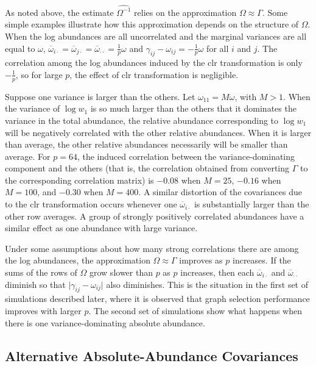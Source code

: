 \documentclass[10pt]{article}
\begin{document}
As noted above, the estimate $\widehat{\Omega^{-1}}$ relies on the approximation $\Omega \approx \Gamma$. Some simple examples illustrate how this approximation depends on the structure of $\Omega$. When the log abundances are all uncorrelated and the marginal variances are all equal to $\omega$, $\overline{\omega}_{i\cdot} = \overline{\omega}_{j\cdot} = \overline{\omega}_{\cdot\cdot} = \frac{1}{p}\omega$ and $\gamma_{ij} - \omega_{ij} = -\frac{1}{p}\omega$ for all $i$ and $j$. The correlation among the log abundances induced by the clr transformation is only $-\frac{1}{p}$, so for large $p$, the effect of clr transformation is negligible.

Suppose one variance is larger than the others. Let $\omega_{11} = M\omega$, with $M > 1$. When the variance of $\log w_1$ is so much larger than the others that it dominates the variance in the total abundance, the relative abundance corresponding to $\log w_1$ will be negatively correlated with the other relative abundances. When it is larger than average, the other relative abundances necessarily will be smaller than average. For $p = 64$, the induced correlation between the variance-dominating component and the others (that is, the correlation obtained from converting $\Gamma$ to the corresponding correlation matrix) is $-0.08$ when $M = 25$, $-0.16$ when $M = 100$, and $-0.30$ when $M = 400$. A similar distortion of the covariances due to the clr transformation occurs whenever one $\overline{\omega}_{i\cdot}$ is substantially larger than the other row averages. A group of strongly positively correlated abundances have a similar effect as one abundance with large variance.

Under some assumptions about how many strong correlations there are among the log abundances, the approximation $\Omega \approx \Gamma$ improves as $p$ increases. If the sums of the rows of $\Omega$ grow slower than $p$ as $p$ increases, then each $\overline{\omega}_{i\cdot}$ and $\overline{\omega}_{\cdot\cdot}$ diminish so that $\vert \gamma_{ij} - \omega_{ij} \rvert$ also diminishes. This is the situation in the first set of simulations described later, where it is observed that graph selection performance improves with larger $p$. The second set of simulations show what happens when there is one variance-dominating absolute abundance.

\subsection*{Alternative Absolute-Abundance Covariances}
\end{document}
